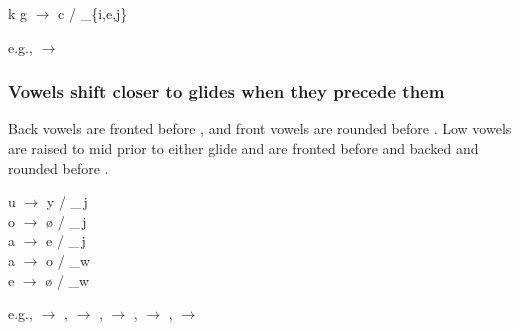 \begin{center}
k g $\to$ c \paljstop{} / \_\{i,e,j\}
\end{center}

e.g.,   $\to$ 

\subsubsection{Vowels shift closer to glides when they precede them}

Back vowels are fronted before , and front vowels are rounded before . Low vowels are raised to mid prior to either glide and are fronted before  and backed and rounded before .

\begin{center}
    u $\to$ y / \_\,j\\
    o $\to$ ø / \_\,j\\
    a $\to$ e / \_\,j\\
    a $\to$ o / \_w\\
    e $\to$ ø / \_w
\end{center}

e.g.,   $\to$ ,   $\to$ ,   $\to$ ,   $\to$ ,   $\to$ 